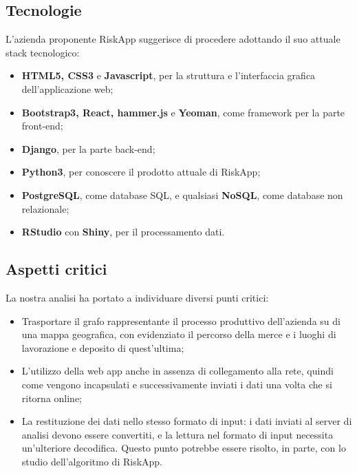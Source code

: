 \subsection{Tecnologie}
L'azienda proponente RiskApp suggerisce di procedere adottando il suo attuale stack tecnologico:
\begin{itemize}
	\item \textbf{HTML5, CSS3} e \textbf{Javascript}, per la struttura e l'interfaccia grafica dell'applicazione web;
	\item \textbf{Bootstrap3, React, hammer.js} e \textbf{Yeoman}, come framework per la parte front-end;
	\item \textbf{Django}, per la parte back-end;
	\item \textbf{Python3}, per conoscere il prodotto attuale di RiskApp;
	\item \textbf{PostgreSQL}, come database SQL, e qualsiasi \textbf{NoSQL}, come database non relazionale;
	\item \textbf{RStudio} con \textbf{Shiny}, per il processamento dati.
\end{itemize}

\subsection{Aspetti critici}

La nostra analisi ha portato a individuare diversi punti critici:
\begin{itemize}
	\item Trasportare il grafo rappresentante il processo produttivo dell’azienda su di una mappa geografica, con evidenziato il percorso della merce e i luoghi di lavorazione e deposito di quest'ultima;
	\item L'utilizzo della web app anche in assenza di collegamento alla rete, quindi come vengono incapsulati e successivamente inviati i dati una volta che si ritorna online;
	\item La restituzione dei dati nello stesso formato di input: i dati inviati al server di analisi devono essere convertiti, e la lettura nel formato di input necessita un'ulteriore decodifica. Questo punto potrebbe essere risolto, in parte, con lo studio dell’algoritmo di RiskApp.
\end{itemize}

